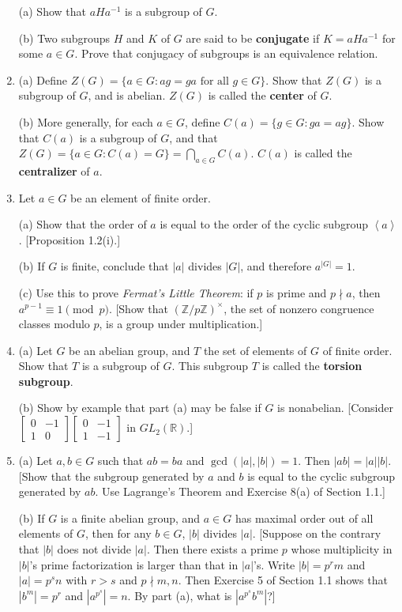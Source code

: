 \documentclass[leqno]{book}
\begin{document}
\begin{enumerate}
(a) Show that $aHa^{-1}$ is a subgroup of $G$.

(b) Two subgroups $H$ and $K$ of $G$ are said to be \textbf{conjugate} if $K=aHa^{-1}$ for some $a\in G$.  Prove that conjugacy of subgroups is an equivalence relation.

\item (a) Define $Z(G)=\{a\in G:ag=ga\text{ for all }g\in G\}$.  Show that $Z(G)$ is a subgroup of $G$, and is abelian.  $Z(G)$ is called the \textbf{center} of $G$.

(b) More generally, for each $a\in G$, define $C(a)=\{g\in G:ga=ag\}$.  Show that $C(a)$ is a subgroup of $G$, and that $Z(G)=\{a\in G:C(a)=G\}=\bigcap_{a\in G}C(a)$.  $C(a)$ is called the \textbf{centralizer} of $a$.

\item Let $a\in G$ be an element of finite order.

(a) Show that the order of $a$ is equal to the order of the cyclic subgroup $\left<a\right>$.  [Proposition 1.2(i).]

(b) If $G$ is finite, conclude that $|a|$ divides $|G|$, and therefore $a^{|G|}=1$.

(c) Use this to prove \emph{Fermat's Little Theorem}: if $p$ is prime and $p\nmid a$, then $a^{p-1}\equiv 1\pmod p$.  [Show that $(\mathbb Z/p\mathbb Z)^\times$, the set of nonzero congruence classes modulo $p$, is a group under multiplication.]

\item (a) Let $G$ be an abelian group, and $T$ the set of elements of $G$ of finite order.  Show that $T$ is a subgroup of $G$.  This subgroup $T$ is called the \textbf{torsion subgroup}.

(b) Show by example that part (a) may be false if $G$ is nonabelian.  [Consider $\begin{bmatrix}0&-1\\1&0\end{bmatrix}\begin{bmatrix}0&-1\\1&-1\end{bmatrix}$ in $GL_2(\mathbb R)$.]

\item (a) Let $a,b\in G$ such that $ab=ba$ and $\gcd(|a|,|b|)=1$.  Then $|ab|=|a||b|$.  [Show that the subgroup generated by $a$ and $b$ is equal to the cyclic subgroup generated by $ab$.  Use Lagrange's Theorem and Exercise 8(a) of Section 1.1.]

(b) If $G$ is a finite abelian group, and $a\in G$ has maximal order out of all elements of $G$, then for any $b\in G$, $|b|$ divides $|a|$. %
[Suppose on the contrary that $|b|$ does not divide $|a|$.  Then there exists a prime $p$ whose multiplicity in $|b|$'s prime factorization is larger than that in $|a|$'s.  Write $|b|=p^rm$ and $|a|=p^sn$ with $r>s$ and $p\nmid m,n$.  Then Exercise 5 of Section 1.1 shows that $|b^m|=p^r$ and $|a^{p^s}|=n$.  By part (a), what is $|a^{p^s}b^m|$?] %
\end{enumerate}
\end{document}
